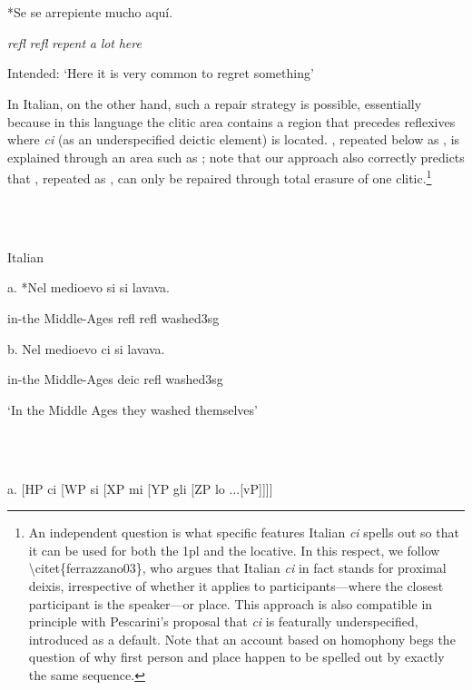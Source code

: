 \documentclass[output=paper,modfonts,nonflat]{langsci/langscibook}
\begin{document}
\ea%
    \label{ex:key:25}
    \gll\\
        \\
    \glt
    \z

         *Se se   arrepiente mucho aquí.

     \textit{refl} \textit{refl}  \textit{repent}     \textit{a} \textit{lot}   \textit{here}

   Intended: ‘Here it is very common to regret something’

In Italian, on the other hand, such a repair strategy is possible, essentially because in this language the clitic area contains a region that precedes reflexives where \textit{ci} (as an underspecified deictic element) is located. , repeated below as , is explained through an area such as ; note that our approach also correctly predicts that , repeated as , can only be repaired through total erasure of one clitic.\footnote{An independent question is what specific features Italian \textit{ci} spells out so that it can be used for both the 1pl and the locative. In this respect, we follow {\textbackslash}citet\{ferrazzano03\}, who argues that Italian \textit{ci} in fact stands for proximal deixis, irrespective of whether it applies to participants—where the closest participant is the speaker—or place. This approach is also compatible in principle with Pescarini’s proposal that \textit{ci} is featurally underspecified, introduced as a default. Note that an account based on homophony begs the question of why first person and place happen to be spelled out by exactly the same sequence.} 

\ea%
    \label{ex:key:26}
    \gll\\
        \\
    \glt
    \z

         Italian 

  a. *Nel medioevo   si  si   lavava. 

         in-the Middle-Ages  refl  refl  washed3sg    

  b. Nel medioevo  ci  si  lavava.

      in-the Middle-Ages  deic  refl  washed3sg    

  ‘In the Middle Ages they washed themselves’

\ea%
    \label{ex:key:27}
    \gll\\
        \\
    \glt
    \z

        a. [HP  ci   [WP   si  [XP  mi  [YP  gli  [ZP lo  ...[vP]]]]
\end{document}
